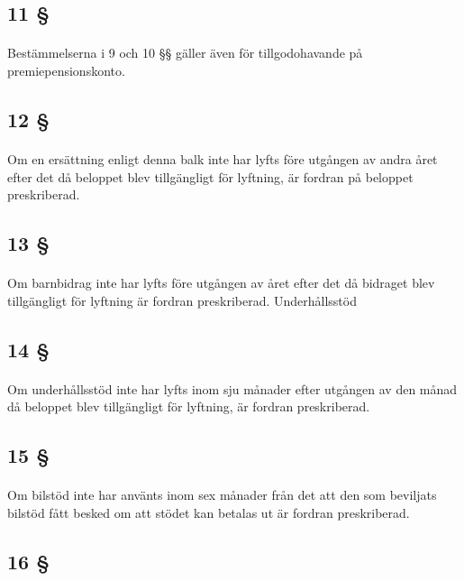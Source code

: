 \documentclass[a4paper,notitlepage,openany,10pt]{book}
\begin{document}
\subsection*{11 §}
\paragraph*{}
Bestämmelserna i 9 och 10 §§ gäller även för tillgodohavande på premiepensionskonto.
\subsection*{12 §}
\paragraph*{}
Om en ersättning enligt denna balk inte har lyfts före utgången av andra året efter det då beloppet blev tillgängligt för lyftning, är fordran på beloppet preskriberad.
\subsection*{13 §}
\paragraph*{}
Om barnbidrag inte har lyfts före utgången av året efter det då bidraget blev tillgängligt för lyftning är fordran preskriberad.
Underhållsstöd
\subsection*{14 §}
\paragraph*{}
Om underhållsstöd inte har lyfts inom sju månader efter utgången av den månad då beloppet blev tillgängligt för lyftning, är fordran preskriberad.
\subsection*{15 §}
\paragraph*{}
Om bilstöd inte har använts inom sex månader från det att den som beviljats bilstöd fått besked om att stödet kan betalas ut är fordran preskriberad.
\subsection*{16 §}
\end{document}
